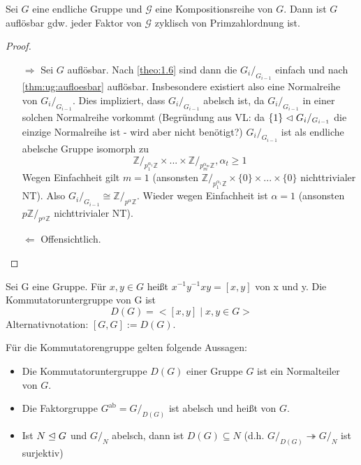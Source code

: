 \documentclass[../main.tex]{subfiles}
\begin{document}
\begin{theorem}\label{theo:1.13}
    Sei $G$ eine endliche Gruppe und $\mathcal{G}$ eine Kompositionsreihe von $G$. Dann ist $G$ auflösbar gdw. jeder Faktor von $\mathcal{G}$ zyklisch von Primzahlordnung ist.
\end{theorem}
\begin{proof}$ $
    \begin{itemize}
        \item[$\Rightarrow$]
        Sei $G$ auflösbar. Nach \ref{theo:1.6} sind dann die $G_i/_{G_{i-1}}$ einfach und nach \cref{thm:ug:aufloesbar} auflösbar.
        Insbesondere existiert also eine Normalreihe von  $G_i/_{G_{i-1}}$.
        Dies impliziert, dass $G_i/_{G_{i-1}}$ abelsch ist, da $G_i/_{G_{i-1}}$ in einer solchen Normalreihe vorkommt (Begründung aus VL: da  $\{1\} \vartriangleleft G_i/_{G_{i-1}}$ die einzige Normalreihe ist - wird aber nicht benötigt?)
        $G_i/_{G_{i-1}}$ ist als endliche abelsche Gruppe isomorph zu
        $$\mathbb{Z}/_{p_1^{\alpha_1}\mathbb{Z}} \times ... \times \mathbb{Z}/_{p_m^{\alpha_m}\mathbb{Z}}, \alpha_t \geq 1$$
        Wegen Einfachheit gilt $m = 1$ (ansonsten $\mathbb{Z}/_{p_1^{\alpha_1}\mathbb{Z}} \times \{0\} \times ... \times \{0\}$ nichttrivialer NT). Also $G_i/_{G_{i-1}} \cong \mathbb{Z}/_{p^\alpha\mathbb{Z}}$. Wieder wegen Einfachheit ist $\alpha = 1$ (ansonsten $p \mathbb{Z}/_{p^\alpha\mathbb{Z}}$ nichttrivialer NT).
        \item[$\Leftarrow$] Offensichtlich.
    \end{itemize}
\end{proof}
\begin{definition}[Kommutator]
    Sei G eine Gruppe. Für $x,y \in G$ heißt $x^{-1}y^{-1}xy = [x,y]$  von x und y. Die Kommutatoruntergruppe von G ist $$D(G) = <[x,y] \mid x,y \in G>$$
    Alternativnotation: $[G,G] := D(G)$.
\end{definition}
\begin{lemma}[Abelisierung]\label{theo:1.15}
Für die Kommutatorengruppe gelten folgende Aussagen:
\begin{itemize}
    \item Die Kommutatoruntergruppe $D(G)$ einer Gruppe $G$ ist ein Normalteiler von $G$.
    \item Die Faktorgruppe $G^\text{ab} = G/_{D(G)}$ ist abelsch und heißt  von $G$.
    \item Ist $N \trianglelefteq G$ und $G/_N$ abelsch, dann ist $D(G) \subseteq N$ (d.h. $G/_{D(G)} \twoheadrightarrow G/_N$ ist surjektiv)
\end{itemize}
\end{lemma}
\end{document}
